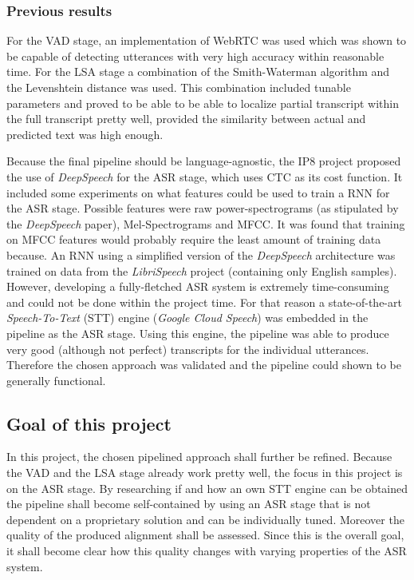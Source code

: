 \subsubsection{Previous results}
For the VAD stage, an implementation of WebRTC was used which was shown to be capable of detecting utterances with very high accuracy within reasonable time. For the LSA stage a combination of the Smith-Waterman algorithm and the Levenshtein distance was used. This combination included tunable parameters and proved to be able to be able to localize partial transcript within the full transcript pretty well, provided the similarity between actual and predicted text was high enough.

Because the final pipeline should be language-agnostic, the IP8 project proposed the use of \textit{DeepSpeech} for the ASR stage, which uses CTC\cite{ctc_paper} as its cost function. It included some experiments on what features could be used to train a RNN for the ASR stage. Possible features were raw power-spectrograms (as stipulated by the \textit{DeepSpeech} paper), Mel-Spectrograms and MFCC. It was found that training on MFCC features would probably require the least amount of training data because. An RNN using a simplified version of the \textit{DeepSpeech} architecture was trained on data from the \textit{LibriSpeech} project (containing only English samples). However, developing a fully-fletched ASR system is extremely time-consuming and could not be done within the project time. For that reason a state-of-the-art \textit{Speech-To-Text} (STT) engine (\textit{Google Cloud Speech}) was embedded in the pipeline as the ASR stage. Using this engine, the pipeline was able to produce very good (although not perfect) transcripts for the individual utterances. Therefore the chosen approach was validated and the pipeline could shown to be generally functional.

\subsection{Goal of this project}

In this project, the chosen pipelined approach shall further be refined. Because the VAD and the LSA stage already work pretty well, the focus in this project is on the ASR stage. By researching if and how an own STT engine can be obtained the pipeline shall become self-contained by using an ASR stage that is not dependent on a proprietary solution and can be individually tuned. Moreover the quality of the produced alignment shall be assessed. Since this is the overall goal, it shall become clear how this quality changes with varying properties of the ASR system.

